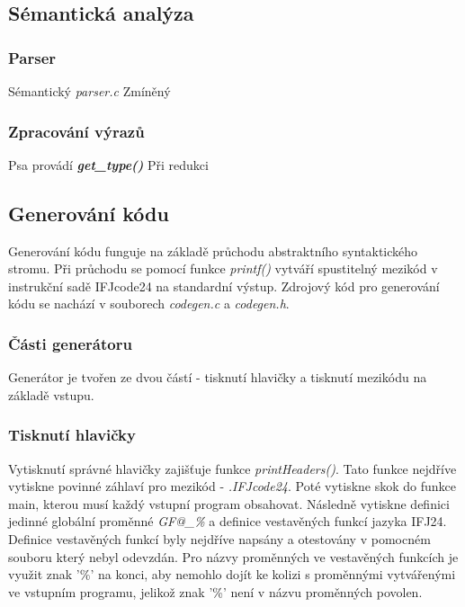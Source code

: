 \documentclass[a4paper, 12pt]{article}
\begin{document}
\newpage
{}
\subsection{Sémantická analýza}
\subsubsection{Parser}
Sémantický \textit{parser.c} Zmíněný

\subsubsection{Zpracování výrazů}
Psa provádí \textit{\textbf{get\_type()}} Při redukci 

\subsection{Generování kódu}
Generování kódu funguje na základě průchodu abstraktního syntaktického stromu. Při průchodu se pomocí funkce \textit{printf()} vytváří spustitelný mezikód v instrukční sadě IFJcode24 na standardní výstup. Zdrojový kód pro generování kódu se nachází v souborech \textit{codegen.c} a \textit{codegen.h}.
\subsubsection{Části generátoru}
Generátor je tvořen ze dvou částí - tisknutí hlavičky a tisknutí mezikódu na základě vstupu.

\subsubsection{Tisknutí hlavičky}
Vytisknutí správné hlavičky zajišťuje funkce \textit{printHeaders()}. Tato funkce nejdříve vytiskne povinné záhlaví pro mezikód - \textit{.IFJcode24}. Poté vytiskne skok do funkce main, kterou musí každý vstupní program obsahovat. Následně vytiskne definici jedinné globální proměnné \textit{GF@\_\%} a definice vestavěných funkcí jazyka IFJ24. Definice vestavěných funkcí byly nejdříve napsány a otestovány v pomocném souboru který nebyl odevzdán. Pro názvy proměnných ve vestavěných funkcích je využit znak '\%' na konci, aby nemohlo dojít ke kolizi s proměnnými vytvářenými ve vstupním programu, jelikož znak '\%' není v názvu proměnných povolen.
\end{document}
